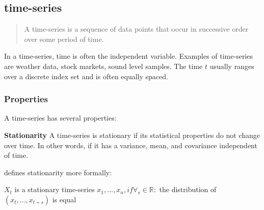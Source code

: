 \subsection{time-series}
\label{sec:time-series}
\begin{quote}
  A time-series is a sequence of data
  points that occur in successive order over some period of time.
\end{quote}
\cite{Hayes}

In a time-series, time is often the independent variable.
Examples of time-series are weather data, stock markets, sound level samples.
The time $t$ usually ranges over a discrete index set and is often equally spaced.

\subsubsection{Properties}
A time-series has several properties:


\textbf{Stationarity}
A time-series is stationary if its statistical properties do not change over time.
In other words, if it has a variance, mean, and covariance independent of time.

\cite{RobJHyndman2014} defines stationarity more formally:
\begin{definition}
  $X_t$ is a stationary time-series
  $x_1, ..., x_n, if \forall_s \in \mathbb{R} :$
  the distribution of $(x_t, ..., x_{t+s})$ is equal
\end{definition}

